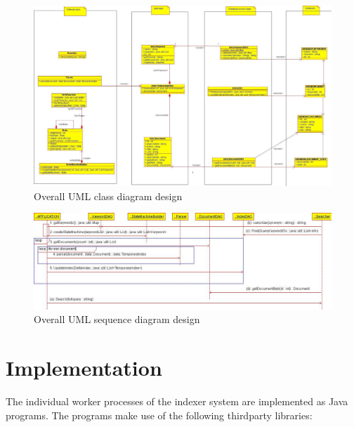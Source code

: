 \documentclass[10pt]{report}
\begin{document}
\begin{figure}
  \begin{center}
	\includegraphics[width=\textwidth,height=!]{overallclassdiagram}
  \end{center}
  \caption{Overall UML class diagram design}
  \label{fig:overallclassdiagram}
\end{figure} 

\begin{figure}
  \begin{center}
	\includegraphics[width=\textwidth,height=!]{overallsequencediagram}
  \end{center}
  \caption{Overall UML sequence diagram design}
  \label{fig:overallsequencediagram}
\end{figure} 





\section{Implementation}
\label{sec:implementation}
The individual worker processes of the indexer system are implemented as Java
programs. The programs make use of the following thirdparty libraries:
\end{document}
